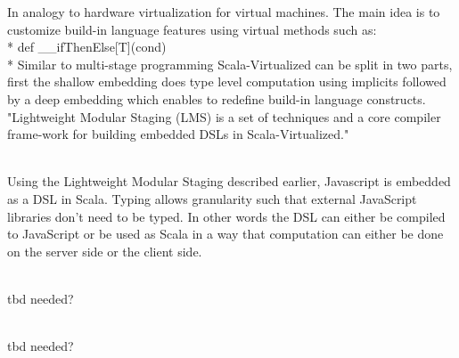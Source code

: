In analogy to hardware virtualization for virtual machines. The main idea is to customize build-in language features using virtual methods such as:\\*
{\ttfamily def \_\_ifThenElse[T](cond) }\\*
Similar to multi-stage programming Scala-Virtualized can be split in two parts, first the shallow embedding does type level computation using implicits followed by a deep embedding which enables to redefine build-in language constructs. "Lightweight Modular Staging (LMS) is a set of techniques and a core compiler frame-work for building embedded DSLs in Scala-Virtualized."
\\
\\

Using the Lightweight Modular Staging described earlier, Javascript is embedded as a DSL in Scala. Typing allows granularity such that external JavaScript libraries don't need to be typed. In other words the DSL can either be compiled to JavaScript or be used as Scala in a way that computation can either be done on the server side or the client side. 
\\
\\

tbd needed?
\\
\\

tbd needed?
\\
\newcommand{\DS}{\begin{sideways}DuctileScala\end{sideways}}
\newcommand{\hask}{\begin{sideways}Haskell\end{sideways}}
\newcommand{\dyn}{\begin{sideways}Dynamic\end{sideways}}
\newcommand{\SV}{\begin{sideways}Scala-Virtualized\end{sideways}}
\newcommand{\dart}{\begin{sideways}Dart\end{sideways}}
\newcommand{\DL}{\begin{sideways}dynamic languages\end{sideways}}
\newcommand{\SJS}{\begin{sideways}Scala-JS interoperatability\end{sideways}}
\newcommand{\JSLMS}{\begin{sideways}JS on LMS\end{sideways}}
\newcommand{\SD}{\begin{sideways}ScalaDyno\end{sideways}}

